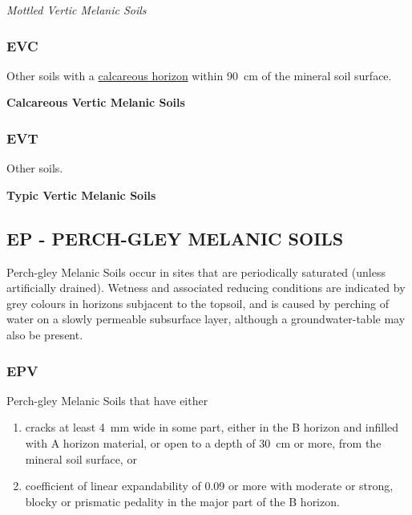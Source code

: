 \documentclass[
  letterpaper,
  DIV=11,
  numbers=noendperiod]{scrreprt}
\providecommand{\tightlist}{%
  \setlength{\itemsep}{0pt}\setlength{\parskip}{0pt}}\usepackage{longtable,booktabs,array}
\begin{document}
\emph{Mottled Vertic Melanic Soils}

\hypertarget{sec-key-EVC}{%
\subsubsection{\texorpdfstring{\textbf{EVC}}{EVC}}\label{sec-key-EVC}}

Other soils with a \protect\hyperlink{sec-diag-calch}{calcareous
horizon} within 90~cm of the mineral soil surface.

\textbf{Calcareous Vertic Melanic Soils}

\hypertarget{sec-key-EVT}{%
\subsubsection{\texorpdfstring{\textbf{EVT}}{EVT}}\label{sec-key-EVT}}

Other soils.

\textbf{Typic Vertic Melanic Soils}

\hypertarget{sec-EP}{%
\subsection{\texorpdfstring{\textbf{EP} - PERCH-GLEY MELANIC
SOILS}{EP - PERCH-GLEY MELANIC SOILS}}\label{sec-EP}}

Perch-gley Melanic Soils occur in sites that are periodically saturated
(unless artificially drained). Wetness and associated reducing
conditions are indicated by grey colours in horizons subjacent to the
topsoil, and is caused by perching of water on a slowly permeable
subsurface layer, although a groundwater-table may also be present.

\hypertarget{sec-key-EPV}{%
\subsubsection{\texorpdfstring{\textbf{EPV}}{EPV}}\label{sec-key-EPV}}

Perch-gley Melanic Soils that have either

\begin{enumerate}
\def\labelenumi{\arabic{enumi}.}
\tightlist
\item
  cracks at least 4~mm wide in some part, either in the B horizon and
  infilled with A horizon material, or open to a depth of 30~cm or more,
  from the mineral soil surface, or
\item
  coefficient of linear expandability of 0.09 or more with moderate or
  strong, blocky or prismatic pedality in the major part of the B
  horizon.
\end{enumerate}
\end{document}
